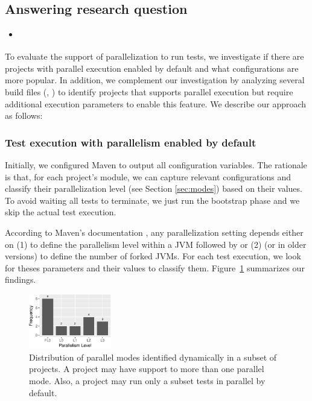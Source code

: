\subsection{Answering research question \numRQC{}}
\label{sec:rqC}

\begin{itemize}
    \item \emph{\RQC}
\end{itemize}

To evaluate the support of parallelization to run tests, we
investigate if there are projects with parallel execution enabled by
default and what configurations are more popular. In addition, we
complement our investigation by analyzing several build files (\ie,
\pomf{}) to identify projects that supports parallel execution but
require additional execution parameters to enable this feature.  We
describe our approach as follows:

\subsubsection{Test execution with parallelism enabled by default}
\label{sec:rqC-1}

Initially, we configured Maven to output all configuration variables.
The rationale is that, for each project's module, we can capture
relevant configurations and classify their parallelization level (see
Section \ref{sec:modes}) based on their values. To avoid waiting all
tests to terminate, we just run the bootstrap phase and we skip the
actual test execution.

According to Maven's documentation , any
parallelization setting depends either on (1)  to
define the parallelism level within a JVM followed by
 or (2)  (or 
in older versions) to define the number of forked JVMs. For each test
execution, we look for theses parameters and their values to classify
them.   Figure~\ref{fig:freqmodes-dynamic} summarizes our
findings.

\begin{figure}[h!]
    \centering
    \includegraphics[width=0.32\textwidth]{plots/barplot-modes-dynamic.pdf}
    \caption{\label{fig:freqmodes-dynamic}Distribution of parallel modes identified dynamically in a
    subset of \numProjectsPar{} projects.  A project may have support
    to more than one parallel mode. Also, a project may run only a
    subset tests in parallel by default.}
\end{figure}

